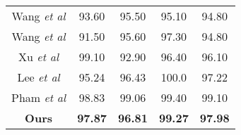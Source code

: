 \documentclass{bmvc2k}
\def\etal{\emph{et al}\bmvaOneDot}
\begin{document}
\begin{table}
{\begin{tabular}{ccccc}
 \\
{\scriptsize \cellcolor{gray!30} Wang \etal \cite{Wang2016GraphBS}} & {\scriptsize \cellcolor{gray!30}   93.60} & {\scriptsize  \cellcolor{gray!30}  95.50}  & {\scriptsize  \cellcolor{gray!30}   95.10} &  {\scriptsize \cellcolor{gray!30}   94.80}
 \\
{\scriptsize  \hspace*{0.01cm} Wang \etal \cite{WengSpatioTemporalNN}} & {\scriptsize  \hspace*{0.01cm} 91.50} & {\scriptsize   \hspace*{0.01cm} 95.60}  & {\scriptsize   \hspace*{0.01cm} 97.30} &  {\scriptsize  \hspace*{0.01cm} 94.80} \\
{\scriptsize \cellcolor{gray!30} Xu \etal \cite{Xu2015SpatioTemporalPM}} & {\scriptsize\cellcolor{gray!30} 99.10} & {\scriptsize \cellcolor{gray!30} 92.90}  & {\scriptsize  \cellcolor{gray!30} 96.40} &  {\scriptsize \cellcolor{gray!30} 96.10} \\
{\scriptsize \hspace*{0.01cm} Lee \etal \cite{lee2017ensemble}} & {\scriptsize  \hspace*{0.01cm} 95.24} & {\scriptsize  \hspace*{0.01cm} 96.43}  & {\scriptsize   \hspace*{0.01cm}  100.0} &  {\scriptsize  \hspace*{0.01cm} 97.22} \\
{\scriptsize \cellcolor{gray!30} \hspace*{0.01cm} Pham \etal \cite{s19081932}} & {\scriptsize \cellcolor{gray!30}  \hspace*{0.01cm} 98.83} & {\scriptsize  \cellcolor{gray!30} \hspace*{0.01cm} 99.06}  & {\scriptsize  \cellcolor{gray!30} \hspace*{0.01cm}  99.40} &  {\scriptsize  \cellcolor{gray!30} \hspace*{0.01cm} 99.10} \\
\hline
{\scriptsize  \hspace*{0.01cm} \textbf{Ours}} & {\scriptsize   \hspace*{0.01cm} \textbf{97.87} } & {\scriptsize   \hspace*{0.01cm} \textbf{96.81}}  & {\scriptsize   \hspace*{0.01cm} \textbf{99.27}} &  {\scriptsize  \hspace*{0.01cm} \textbf{97.98}} \\    

\end{tabular}}
\end{table}
\end{document}

